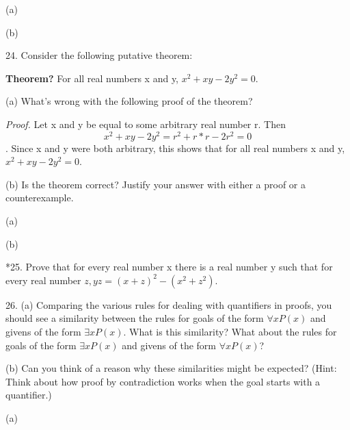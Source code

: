 \documentclass{article}
\begin{document}
(a)

\vspace{20pt}

(b)

\vspace{30pt}

24. Consider the following putative theorem:

\textbf{Theorem?} For all real numbers x and y, $x^2 + x y - 2y^2 = 0$.

\hspace{12pt}(a) What's wrong with the following proof of the theorem?

\textit{Proof.} Let x and y be equal to some arbitrary real number r. Then
$$x^2 + x y - 2y^2 = r^2 + r * r - 2r^2 = 0$$.
Since x and y were both arbitrary, this shows that for all real numbers
x and y, $x^2 + x y - 2y^2 = 0$.

\hspace{12pt}(b) Is the theorem correct? Justify your answer with either a proof or a
counterexample.
\vspace{30pt}

(a)

\vspace{20pt}

(b)

\vspace{30pt}

*25. Prove that for every real number x there is a real number y such that for
every real number $z, yz = (x + z)^2 - (x^2 + z^2)$.
\vspace{30pt}



\vspace{30pt}

26. (a) Comparing the various rules for dealing with quantifiers in proofs,
you should see a similarity between the rules for goals of the form
$\forall x P(x)$ and givens of the form $\exists x P(x)$. What is this similarity?
What about the rules for goals of the form $\exists x P(x)$ and givens of the
form $\forall x P(x)$?

\hspace{12pt}(b) Can you think of a reason why these similarities might be expected?
(Hint: Think about how proof by contradiction works when the goal
starts with a quantifier.)
\vspace{30pt}

(a)

\vspace{20pt}
\end{document}
